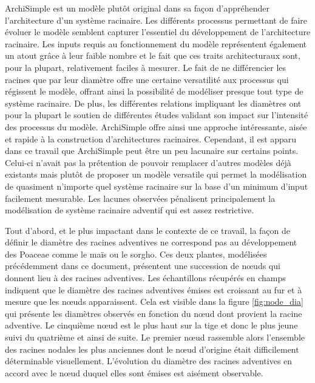 ArchiSimple est un modèle plutôt original dans sa façon d'appréhender l'architecture d'un système racinaire.
Les différents processus permettant de faire évoluer le modèle semblent capturer l'essentiel du développement de l'architecture racinaire.
Les inputs requis au fonctionnement du modèle représentent également un atout grâce à leur faible nombre et le fait que ces traits architecturaux sont, pour la plupart, relativement faciles à mesurer.
Le fait de ne différencier les racines que par leur diamètre offre une certaine versatilité aux processus qui régissent le modèle, offrant ainsi la possibilité de modéliser presque tout type de système racinaire.
De plus, les différentes relations impliquant les diamètres ont pour la plupart le soutien de différentes études validant son impact sur l'intensité des processus du modèle.
ArchiSimple offre ainsi une approche intéressante, aisée et rapide à la construction d'architectures racinaires.
Cependant, il est apparu dans ce travail que ArchiSimple peut être un peu lacunaire sur certains points.
Celui-ci n'avait pas la prétention de pouvoir remplacer d'autres modèles déjà existants mais plutôt de proposer un modèle versatile qui permet la modélisation de quasiment n'importe quel système racinaire sur la base d'un minimum d'input facilement mesurable.
Les lacunes observées pénalisent principalement la modélisation de système racinaire adventif qui est assez restrictive.
\newline

Tout d'abord, et le plus impactant dans le contexte de ce travail, la façon de définir le diamètre des racines adventives ne correspond pas au développement des Poaceae comme le maïs ou le sorgho.
Ces deux plantes, modélisées précédemment dans ce document, présentent une succession de nœuds qui donnent lieu à des racines adventives.
Les échantillons récupérés en champs indiquent que le diamètre des racines adventives émises est croissant au fur et à mesure que les nœuds apparaissent.
Cela est visible dans la figure \ref{fig:node_dia} qui présente les diamètres observés en fonction du nœud dont provient la racine adventive.
Le cinquième nœud est le plus haut sur la tige et donc le plus jeune suivi du quatrième et ainsi de suite.
Le premier nœud rassemble alors l'ensemble des racines nodales les plus anciennes dont le nœud d'origine était difficilement déterminable visuellement.
L'évolution du diamètre des racines adventives en accord avec le nœud duquel elles sont émises est aisément observable.

